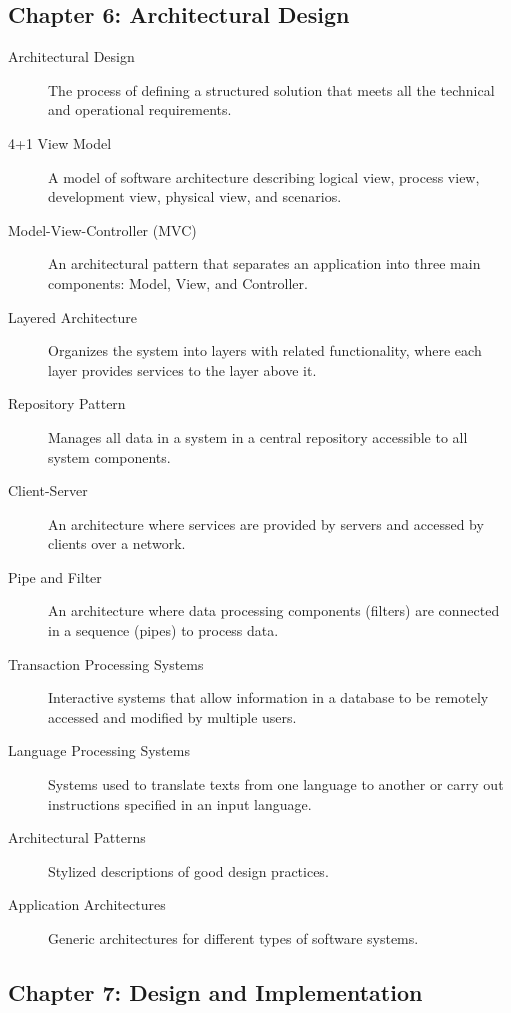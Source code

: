 \documentclass{article}
\begin{document}
\subsection{Chapter 6: Architectural Design}

\begin{description}
  \item[Architectural Design] The process of defining a structured solution that meets all the technical and operational requirements.
  \item[4+1 View Model] A model of software architecture describing logical view, process view, development view, physical view, and scenarios.
  \item[Model-View-Controller (MVC)] An architectural pattern that separates an application into three main components: Model, View, and Controller.
  \item[Layered Architecture] Organizes the system into layers with related functionality, where each layer provides services to the layer above it.
  \item[Repository Pattern] Manages all data in a system in a central repository accessible to all system components.
  \item[Client-Server] An architecture where services are provided by servers and accessed by clients over a network.
  \item[Pipe and Filter] An architecture where data processing components (filters) are connected in a sequence (pipes) to process data.
  \item[Transaction Processing Systems] Interactive systems that allow information in a database to be remotely accessed and modified by multiple users.
  \item[Language Processing Systems] Systems used to translate texts from one language to another or carry out instructions specified in an input language.
  \item[Architectural Patterns] Stylized descriptions of good design practices.
  \item[Application Architectures] Generic architectures for different types of software systems.
\end{description}

\subsection{Chapter 7: Design and Implementation}
\end{document}
